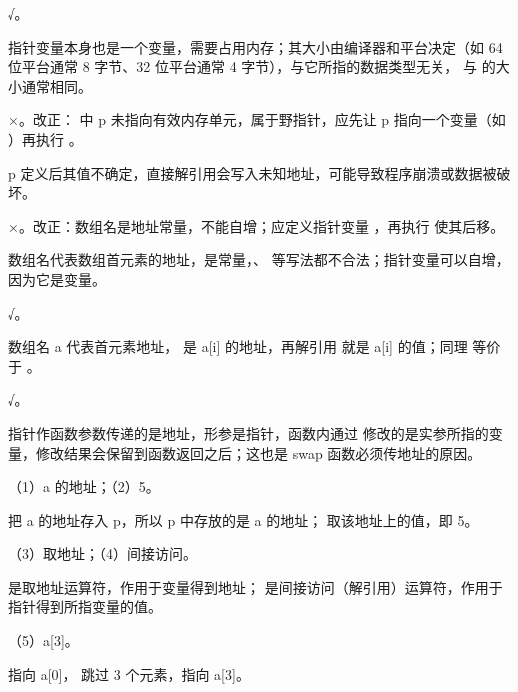 \documentclass[a4paper,11pt]{article}
\begin{document}

\q √。\begin{analysis}指针变量本身也是一个变量，需要占用内存；其大小由编译器和平台决定（如 64 位平台通常 8 字节、32 位平台通常 4 字节），与它所指的数据类型无关， 与  的大小通常相同。\end{analysis}

\q ×。改正： 中 p 未指向有效内存单元，属于野指针，应先让 p 指向一个变量（如 ）再执行 。\begin{analysis}p 定义后其值不确定，直接解引用会写入未知地址，可能导致程序崩溃或数据被破坏。\end{analysis}

\q ×。改正：数组名是地址常量，不能自增；应定义指针变量 ，再执行  使其后移。\begin{analysis}数组名代表数组首元素的地址，是常量，、 等写法都不合法；指针变量可以自增，因为它是变量。\end{analysis}

\q √。\begin{analysis}数组名 a 代表首元素地址， 是 a[i] 的地址，再解引用  就是 a[i] 的值；同理  等价于 。\end{analysis}

\q √。\begin{analysis}指针作函数参数传递的是地址，形参是指针，函数内通过  修改的是实参所指的变量，修改结果会保留到函数返回之后；这也是 swap 函数必须传地址的原因。\end{analysis}


\q （1）a 的地址；（2）5。\begin{analysis} 把 a 的地址存入 p，所以 p 中存放的是 a 的地址； 取该地址上的值，即 5。\end{analysis}

\q （3）取地址；（4）间接访问。\begin{analysis}\code{\&} 是取地址运算符，作用于变量得到地址；\code{*} 是间接访问（解引用）运算符，作用于指针得到所指变量的值。\end{analysis}

\q （5）a[3]。\begin{analysis} 指向 a[0]， 跳过 3 个元素，指向 a[3]。\end{analysis}
\end{document}
